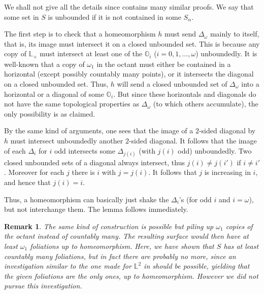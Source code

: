 \documentclass{amsart}
\newtheorem{rem}[theorem]{Remark}
\begin{document}
We shall not give all the details since \cite{BaillifArxiv} contains many similar proofs. We say that some set in $S$ is unbounded if it is not contained in some $S_\alpha$.

The first step is to check that a homeomorphism $h$ must send $\Delta_\omega$ mainly to itself, that is, its image must intersect it on a closed unbounded set. This is because any copy of ${\mathbb{L}}_+$ must intersect at least one of the ${\mathbb{O}}_i$ ($i=0,1,\dots,\omega$) unboundedly. It is well-known that a copy of $\omega_1$ in the octant must either be contained in a horizontal (except possibly countably many points), or it intersects the diagonal on a closed unbounded set. Thus, $h$ will send a closed unbounded set of $\Delta_\omega$ into a horizontal or a diagonal of some ${\mathbb{O}}_i$. But since these horizontals and diagonals do not have the same topological properties as $\Delta_\omega$ (to which others accumulate), the only possibility is as claimed.

By the same kind of arguments, one sees that the image of a $2$-sided diagonal by $h$ must intersect unboundedly another $2$-sided diagonal. It follows that the image of each $\Delta_i$ for $i$ odd intersects some $\Delta_{j(i)}$ (with $j(i)$ odd) unboundedly. Two closed unbounded sets of a diagonal always intersect, thus $j(i)\not= j(i')$ if $i\not= i'$. Moreover for each $j$ there is $i$ with $j=j(i)$. It follows that $j$ is increasing in $i$, and hence that $j(i)=i$.

Thus, a homeomorphism can basically just shake the $\Delta_i$'s (for odd $i$ and $i=\omega$), but not interchange them. The lemma follows immediately.
\endproof

\begin{rem}
{\rm The same kind of construction is possible but piling up $\omega_1$ copies of the octant instead of countably many. The resulting surface would then have at least $\omega_1$ foliations up to homeomorphism. Here, we have shown that $S$ has at least countably many foliations, but in fact there are probably no more, since an investigation similar to the one made for ${\mathbb{L}}^2$ in \cite{BGG} should be possible, yielding that the given foliations are the only ones, up to homeomorphism. However we did not pursue this investigation.}
\end{rem}
\end{document}
